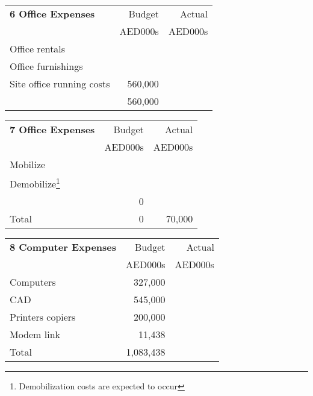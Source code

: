 \documentclass[oneside]{scrbook}
\begin{document}
\begin{tabularx}{\linewidth}{Xrr}
\textbf{6 Office Expenses}                                        &Budget   &Actual\\
                                                                               &AED000s &AED000s\\
 \noalign{\DotRow{}{}}                                                                                 
Office rentals									&	&\\
Office furnishings								&	&\\
Site office running costs							&560,000 &\\
\noalign{\DotRow{}{}}                                                                                  
												&560,000 & \\
\end{tabularx}    
\vspace*{1.8cm}

\begin{tabularx}{\linewidth}{Xrr}
\textbf{7 Office Expenses}                                        &Budget   &Actual\\
                                                                               &AED000s &AED000s\\
 \noalign{\DotRow{}{}}                                                                                 
Mobilize									&	&\\
Demobilize\footnote{Demobilization costs are expected to occur}    								&	&\\
											&0 &\\
\noalign{\DotRow{}{}}                                                                                  
Total												&0 &70,000 \\
\end{tabularx}    
\vspace*{1.8cm}




\begin{tabularx}{\linewidth}{Xrr}
\textbf{8 Computer Expenses}                                        &Budget   &Actual\\
                                                                               &AED000s &AED000s\\
 \noalign{\DotRow{}{}} 
Computers 											&327,000	&\\
CAD           											&545,000	&\\
Printers copiers &									200,000		&\\
Modem link                                                              	&11,438		&\\
\noalign{\DotRow{}{}} 
Total   & 1,083,438    &\\
\end{tabularx}    
\vspace*{1.8cm plus3mm minus3mm}
\end{document}
